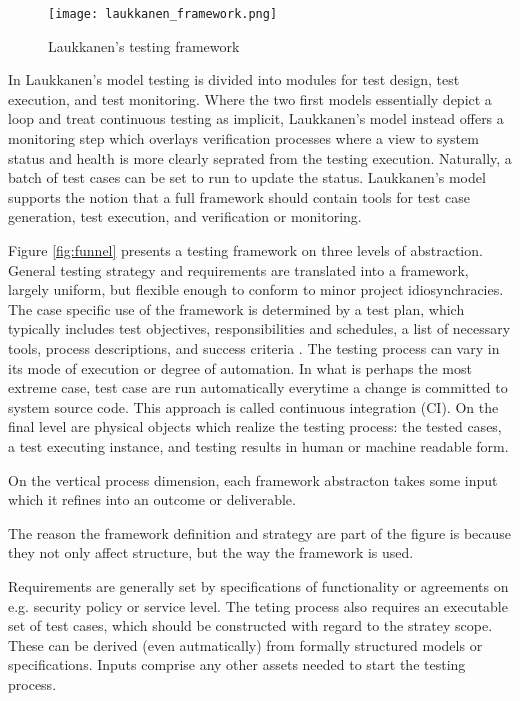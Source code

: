 \documentclass[12pt,a4paper,oneside,pdftex]{report}
\begin{document}
{\begin{figure}[ht]
  \begin{center}
    \texttt{[image: laukkanen\_framework.png]}
    \caption{Laukkanen's testing framework \citep{laukkanen2006data}}
    \label{fig:laukkanen} 
  \end{center}
\end{figure}

In Laukkanen's model testing is divided into modules for test design, test execution, and test monitoring.
Where the two first models essentially depict a loop and treat continuous testing as implicit, Laukkanen's model instead offers a monitoring step which overlays verification processes where a view to system status and health is more clearly seprated from the testing execution. Naturally, a batch of test cases can be set to run to update the status. Laukkanen's model supports the notion that a full framework should contain tools for test case generation, test execution, and verification or monitoring.

Figure \ref{fig:funnel} presents a testing framework on three levels of abstraction. General testing strategy and requirements are translated into a framework, largely uniform, but flexible enough to conform to minor project idiosynchracies. The case specific use of the framework is determined by a test plan, which typically includes test objectives, responsibilities and schedules, a list of necessary tools, process descriptions, and success criteria \citep{myers1976software}. The testing process can vary in its mode of execution or degree of automation. In what is perhaps the most extreme case, test case are run automatically everytime a change is committed to system source code. This approach is called continuous integration (CI). On the final level are physical objects which realize the testing process: the tested cases, a test executing instance, and testing results in human or machine readable form.

On the vertical process dimension, each framework abstracton takes some input which it refines into an outcome or deliverable.



The reason the framework definition and strategy are part of the figure is because they not only affect structure, but the way the framework is used.

Requirements are generally set by specifications of functionality or agreements on e.g. security policy or service level. The teting process also requires an executable set of test cases, which should be constructed with regard to the stratey scope. These can be derived (even autmatically) from formally structured models or specifications. Inputs comprise any other assets needed to start the testing process.



}
\end{document}
